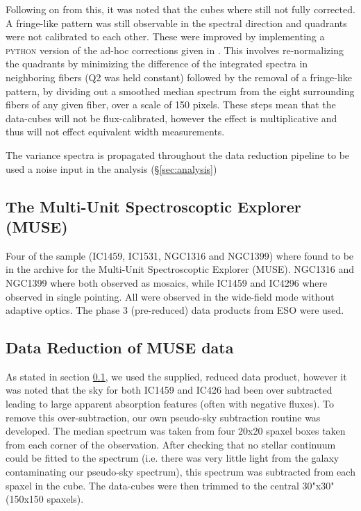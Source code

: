 \documentclass[fleqn,usenatbib,useAMS]{mnras}
\begin{document}

		Following on from this, it was noted that the cubes where still not fully corrected. A fringe-like pattern was still observable in the spectral direction and quadrants were not calibrated to each other. These were improved by implementing a \textsc{python} version of the ad-hoc corrections given in \citet{Lagerholm2012}. This involves re-normalizing the quadrants by minimizing the difference of the integrated spectra in neighboring fibers (Q2 was held constant) followed by the removal of a fringe-like pattern, by dividing out a smoothed median spectrum from the eight surrounding fibers of any given fiber, over a scale of 150 pixels. These steps mean that the data-cubes will not be flux-calibrated, however the effect is multiplicative and thus will not effect equivalent width measurements.  

		The variance spectra is propagated throughout the data reduction pipeline to be used a noise input in the analysis (\S \ref{sec:analysis})
	

	\subsection{The Multi-Unit Spectroscoptic Explorer (MUSE)}
		\label{subsec:MUSE}
		Four of the sample (IC1459, IC1531, NGC1316 and NGC1399) where found to be in the archive for the Multi-Unit Spectroscoptic Explorer (MUSE). NGC1316 and NGC1399 where both observed as mosaics, while IC1459 and IC4296 where observed in single pointing. All were observed in the wide-field mode without adaptive optics. The phase 3 (pre-reduced) data products from ESO were used. 

	\subsection{Data Reduction of MUSE data}
		\label{subsec:reductMUSE}
		As stated in section \ref{subsec:MUSE}, we used the supplied, reduced data product, however it was noted that the sky for both IC1459 and IC426 had been over subtracted leading to large apparent absorption features (often with negative fluxes). To remove this over-subtraction, our own pseudo-sky subtraction routine was developed. The median spectrum was taken from four 20x20 spaxel boxes taken from each corner of the observation. After checking that no stellar continuum could be fitted to the spectrum (i.e. there was very little light from the galaxy contaminating our pseudo-sky spectrum), this spectrum was subtracted from each spaxel in the cube. The data-cubes were then trimmed to the central 30"x30" (150x150 spaxels).
	
\end{document}
